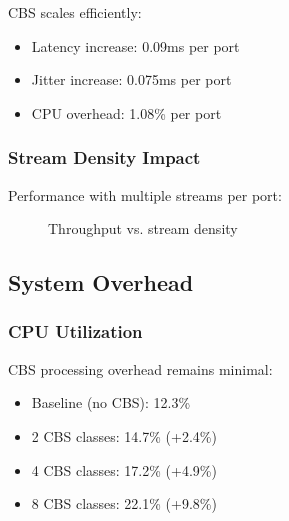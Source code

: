 \documentclass[10pt, journal, compsoc]{IEEEtran}
\begin{document}
CBS scales efficiently:
\begin{itemize}
    \item Latency increase: 0.09ms per port
    \item Jitter increase: 0.075ms per port
    \item CPU overhead: 1.08\% per port
\end{itemize}

\subsubsection{Stream Density Impact}

Performance with multiple streams per port:

\begin{figure}[h]
\centering
{}
\caption{Throughput vs. stream density}
\label{fig:stream_density}
\end{figure}

\subsection{System Overhead}

\subsubsection{CPU Utilization}

CBS processing overhead remains minimal:

\begin{itemize}
    \item Baseline (no CBS): 12.3\%
    \item 2 CBS classes: 14.7\% (+2.4\%)
    \item 4 CBS classes: 17.2\% (+4.9\%)
    \item 8 CBS classes: 22.1\% (+9.8\%)
\end{itemize}
\end{document}
